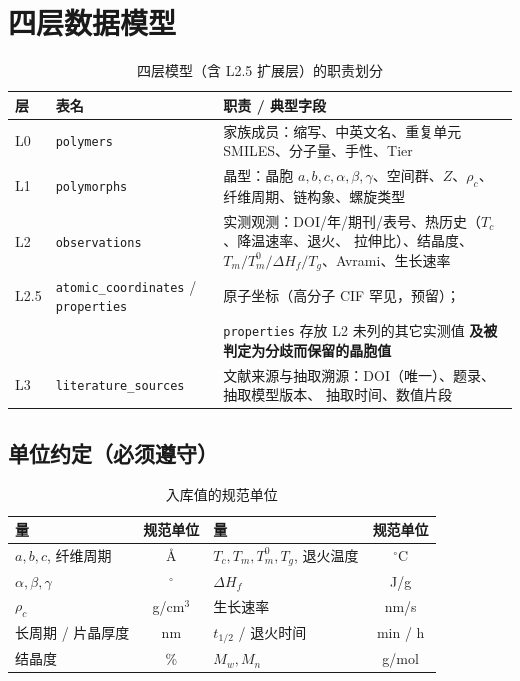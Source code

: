 \documentclass[11pt,a4paper]{ctexart}
\begin{document}
\section{四层数据模型}

\begin{table}[htbp]
\centering
\caption{四层模型（含 L2.5 扩展层）的职责划分}
\label{tab:layers}
\begin{tabularx}{\textwidth}{l l X}
\toprule
层 & 表名 & 职责 / 典型字段 \\
\midrule
L0 & \texttt{polymers} & 家族成员：缩写、中英文名、重复单元 SMILES、分子量、手性、Tier \\
L1 & \texttt{polymorphs} & 晶型：晶胞 $a,b,c,\alpha,\beta,\gamma$、空间群、$Z$、$\rho_c$、
                            纤维周期、链构象、螺旋类型 \\
L2 & \texttt{observations} & 实测观测：DOI/年/期刊/表号、热历史（$T_c$、降温速率、退火、
                            拉伸比）、结晶度、$T_m/T_m^0/\Delta H_f/T_g$、Avrami、生长速率 \\
L2.5 & \texttt{atomic\_coordinates} / \texttt{properties} &
                            原子坐标（高分子 CIF 罕见，预留）；\\
    &  & \texttt{properties} 存放 L2 未列的其它实测值 \textbf{及被判定为分歧而保留的晶胞值} \\
L3 & \texttt{literature\_sources} & 文献来源与抽取溯源：DOI（唯一）、题录、抽取模型版本、
                            抽取时间、数值片段 \\
\bottomrule
\end{tabularx}
\end{table}

\subsection{单位约定（必须遵守）}
\begin{table}[htbp]
\centering
\caption{入库值的规范单位}
\label{tab:units}
\begin{tabularx}{\textwidth}{l c l c}
\toprule
量 & 规范单位 & 量 & 规范单位 \\
\midrule
$a,b,c$, 纤维周期 & \AA{} & $T_c,T_m,T_m^0,T_g$, 退火温度 & $^\circ$C \\
$\alpha,\beta,\gamma$ & $^\circ$ & $\Delta H_f$ & J/g \\
$\rho_c$ & g/cm$^3$ & 生长速率 & nm/s \\
长周期 / 片晶厚度 & nm & $t_{1/2}$ / 退火时间 & min / h \\
结晶度 & \% & $M_w,M_n$ & g/mol \\
\bottomrule
\end{tabularx}
\end{table}
\end{document}
